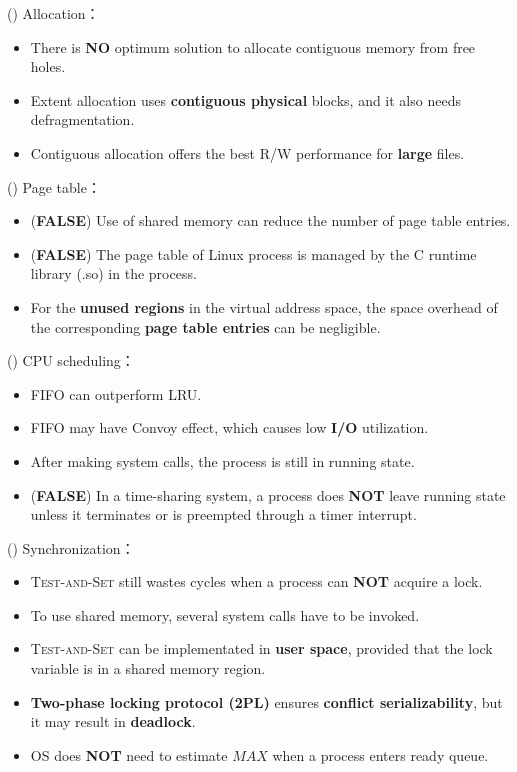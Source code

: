 \begin{theorem}{()} Allocation： \begin{itemize}
        \item There is \textbf{NO} optimum solution to allocate contiguous memory from free holes.
        \item Extent allocation uses \textbf{contiguous physical} blocks, and it also needs defragmentation.
        \item Contiguous allocation offers the best R/W performance for \textbf{large} files.
    \end{itemize}
\end{theorem}

\begin{theorem}{()} Page table： \begin{itemize}
        \item (\textbf{FALSE}) Use of shared memory can reduce the number of page table entries.
        \item (\textbf{FALSE}) The page table of Linux process is managed by the C runtime library (.so) in the process.
        \item For the \textbf{unused regions} in the virtual address space, the space overhead of the corresponding \textbf{page table entries} can be negligible.
    \end{itemize}
\end{theorem}

\begin{theorem}{()} CPU scheduling： \begin{itemize}
        \item FIFO can outperform LRU.
        \item FIFO may have Convoy effect, which causes low \textbf{I/O} utilization.
        \item After making system calls, the process is still in running state.
        \item (\textbf{FALSE}) In a time-sharing system, a process does \textbf{NOT} leave running state unless it terminates or is preempted through a timer interrupt. 
    \end{itemize}
\end{theorem}

\begin{theorem}{()} Synchronization： \begin{itemize}
        \item \textsc{Test-and-Set} still wastes cycles when a process can \textbf{NOT} acquire a lock. 
        \item To use shared memory, several system calls have to be invoked.
        \item \textsc{Test-and-Set} can be implementated in \textbf{user space}, provided that the lock variable is in a shared memory region.
        \item \textbf{Two-phase locking protocol (2PL)} ensures \textbf{conflict serializability}, but it may result in \textbf{deadlock}.
        \item OS does \textbf{NOT} need to estimate $MAX$ when a process enters ready queue.
    \end{itemize}
\end{theorem}

